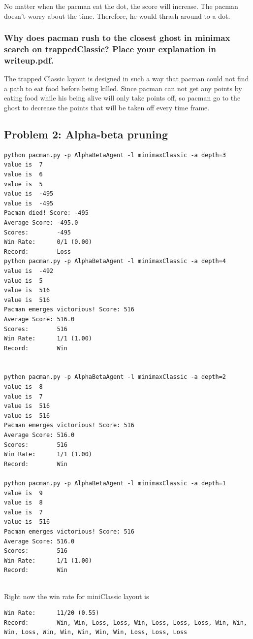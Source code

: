 \documentclass[12pt]{article}
\begin{document}
No matter when the pacman eat the dot, the score will increase. The pacman doesn't worry about the time. Therefore, he would thrash around to a dot. 


\subsubsection{Why does pacman rush to the closest ghost in minimax search on trappedClassic? Place your explanation in writeup.pdf.}

The trapped Classic layout is designed in such a way that pacman could not find a path to eat food before being killed. Since pacman can not get any points by eating food while his being alive will only take points off, so pacman go to the ghost to decrease the points that will be taken off every time frame.











\subsection{Problem 2: Alpha-beta pruning }
\begin{lstlisting}
python pacman.py -p AlphaBetaAgent -l minimaxClassic -a depth=3
value is  7
value is  6
value is  5
value is  -495
value is  -495
Pacman died! Score: -495
Average Score: -495.0
Scores:        -495
Win Rate:      0/1 (0.00)
Record:        Loss
python pacman.py -p AlphaBetaAgent -l minimaxClassic -a depth=4
value is  -492
value is  5
value is  516
value is  516
Pacman emerges victorious! Score: 516
Average Score: 516.0
Scores:        516
Win Rate:      1/1 (1.00)
Record:        Win


python pacman.py -p AlphaBetaAgent -l minimaxClassic -a depth=2
value is  8
value is  7
value is  516
value is  516
Pacman emerges victorious! Score: 516
Average Score: 516.0
Scores:        516
Win Rate:      1/1 (1.00)
Record:        Win

python pacman.py -p AlphaBetaAgent -l minimaxClassic -a depth=1
value is  9
value is  8
value is  7
value is  516
Pacman emerges victorious! Score: 516
Average Score: 516.0
Scores:        516
Win Rate:      1/1 (1.00)
Record:        Win


\end{lstlisting}
Right now the win rate for miniClassic layout is 
\begin{lstlisting}
Win Rate:      11/20 (0.55)
Record:        Win, Win, Loss, Loss, Win, Loss, Loss, Loss, Win, Win, Win, Loss, Win, Win, Win, Win, Win, Loss, Loss, Loss
\end{lstlisting}
\end{document}
